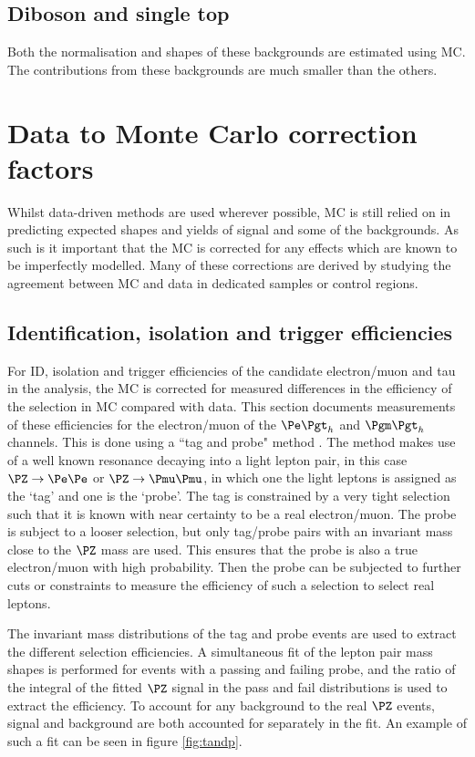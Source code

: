 \subsection{Diboson and single top}
Both the normalisation and shapes of these backgrounds are estimated using \ac{MC}.
The contributions from these backgrounds are much smaller than the others.

\section{Data to Monte Carlo correction factors}
\label{sec:datamcfactors}

Whilst data-driven methods are used wherever possible, \ac{MC} is still
relied on in predicting expected shapes and yields of signal and some of the
backgrounds. As such is it important that the \ac{MC} is corrected for
any effects which are known to be imperfectly modelled. Many of these corrections
are derived by studying the agreement between \ac{MC} and data in dedicated
samples or control regions.

\subsection{Identification, isolation and trigger efficiencies}
\label{sec:idisotrigger}

For ID, isolation and trigger efficiencies of the candidate electron/muon 
and tau in the analysis, the \ac{MC} is corrected for measured differences in 
the efficiency of the selection in \ac{MC} compared with data. 
This section documents measurements of these efficiencies for the electron/muon 
of the $\etau$ and $\mutau$ channels. This is done using a ``tag and probe"
method \cite{Khachatryan:2010xn}.
The method makes use of a well known resonance decaying
into a light lepton pair, in this case $\PZ\to\Pe\Pe$ or $\PZ\to\Pmu\Pmu$, 
in which one the light leptons is assigned as the `tag' and one is the `probe'. 
The tag is constrained by a very tight selection such that it is known with near 
certainty to be a real electron/muon. The probe is subject to a looser selection, 
but only tag/probe pairs with an invariant mass close to the $\PZ$ mass are used. 
This ensures that the probe is also a true electron/muon with high probability. 
Then the probe can be subjected to further cuts or constraints to measure the 
efficiency of such a selection to select real leptons.

The invariant mass distributions of the tag and probe events are used to extract
the different selection efficiencies. A simultaneous fit of the lepton pair mass
shapes is performed for events with a passing and failing probe, 
and the ratio of the integral of the fitted $\PZ$ signal 
in the pass and fail distributions is used to extract the efficiency. To account for any background
to the real $\PZ$ events, signal and background are both accounted for
separately in the fit. An example of such a fit can be seen in figure
\ref{fig:tandp}.

